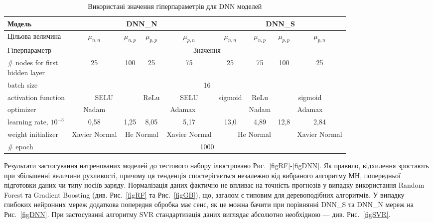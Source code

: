 \documentclass[12pt,a4paper,titlepage,oneside]{book}
\numberwithin{equation}{part}
\begin{document}
\begin{table}[!ht]
\setlength{\tabcolsep}{1pt}
\caption{Використані значення гіперпараметрів для DNN моделей}
\label{tblDNNrez}
\centering
\begin{tabular}{|l|c|c|c|c|c|c|c|c|}
\hline
Модель& \multicolumn{4}{c|}{DNN\_N}& \multicolumn{4}{c|}{DNN\_S} \rule{0pt}{11pt}\\
\hline
Цільова величина&$\mu_{n,n}$&$\mu_{n,p}$&$\mu_{p,p}$&$\mu_{p,n}$&$\mu_{n,n}$&$\mu_{n,p}$&$\mu_{p,p}$&$\mu_{p,n}$\\
\hline
Гіперпараметр&\multicolumn{8}{c|}{Значення}\\
\hline
\makecell{\# nodes for first \\hidden layer} &25&100&25&75&25&75&100&25\\
\hline
batch size&\multicolumn{8}{c|}{16}\\
\hline
activation function &\multicolumn{2}{c|}{SELU}&ReLu&SELU&sigmoid&ReLu&\multicolumn{2}{c|}{sigmoid}\\
\hline
optimizer	&Nadam&\multicolumn{4}{c|}{Adamax}&Nadam&\multicolumn{2}{c|}{Adamax}\\
\hline
learning rate, $10^{-3}$	&0,58&1,25&8,05&5,17&13,0&4,89&12,8&2,84\\
\hline
weight initializer &Xavier Normal&\multicolumn{2}{c|}{He Normal}&Xavier Normal&\multicolumn{3}{c|}{He Normal}&Xavier Normal\\
\hline
\# epoch &\multicolumn{8}{c|}{1000}\\
\hline
\end{tabular}
\end{table}

Результати застосування натренованих моделей до тестового набору ілюстровано Рис.~\ref{figRF}-\ref{figDNN}.
Як правило, відхилення зростають при збільшенні величини рухливості, причому ця тенденція спостерігається
незалежно від вибраного алгоритму МН, попередньої підготовки даних чи типу носіїв заряду.
Нормалізація даних фактично не впливає на точність прогнозів у випадку використання Random Forest та Gradient Boosting
(див. Рис.~\ref{figRF} та Рис.~\ref{figGB}), що, загалом є типовим для деревоподібних алгоритмів.
У випадку глибоких нейронних мереж додаткова попередня обробка має сенс, як це можна бачити при порівнянні DNN\_S та DNN\_N мереж
на Рис.~\ref{figDNN}.
При застосуванні алгоритму SVR стандартизація даних виглядає абсолютно необхідною --- див. Рис.~\ref{figSVR}.
\end{document}
